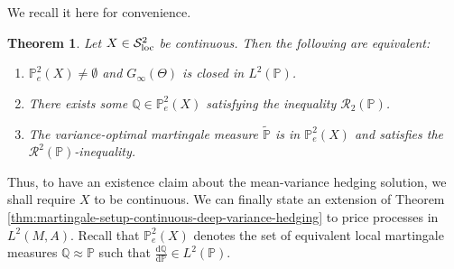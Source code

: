\documentclass[11pt,a4paper,twoside,openany]{report}
\numberwithin{equation}{section}
\newcommand{\diff}{\mathrm{d}}
\theoremstyle{plain} %
\newtheorem{theorem}{Theorem}[section]
\theoremstyle{definition} %
\theoremstyle{remark} %
\begin{document}
We recall it here for convenience.
\begin{theorem}\label{thm:recalling closedness of G_T(Theta)}
Let $X\in\mathcal{S}^2_{\rm{loc}}$ be continuous. Then the following are equivalent:
\begin{enumerate}
\item \(\mathbb{P}_e^2(X)\neq\emptyset\) and
 $G_{\infty}(\Theta)$ is closed in $L^2(\mathbb{P})$.
\item There exists some \(\mathbb{Q}\in\mathbb{P}_e^2(X)\) satisfying the inequality
      $\mathcal{R}_2(\mathbb{P})$.
\item The variance-optimal martingale measure \(\widetilde{\mathbb{P}}\) is in \(\mathbb{P}_e^2(X)\) and satisfies the \(\mathcal{R}^2(\mathbb{P})\)-inequality.
\end{enumerate}
\end{theorem}
Thus, to have an existence claim about the mean-variance hedging solution, we shall require \(X\) to be continuous. We can finally state an extension of 
Theorem \ref{thm:martingale-setup-continuous-deep-variance-hedging} to price processes in \(L^2(M,A)\). Recall that  \(\mathbb{P}_e^2(X)\) denotes the set of equivalent local martingale measures \(\mathbb{Q}\approx \mathbb{P}\) such that \(\frac{\diff \mathbb{Q}}{\diff \mathbb{P}}\in L^2(\mathbb{P})\).
\end{document}
